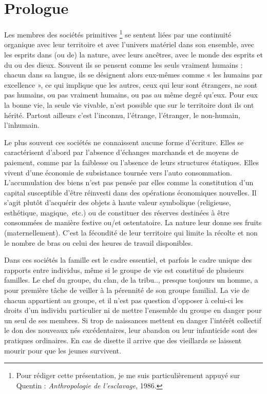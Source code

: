 

\chapter{Prologue}


Les membres des sociétés primitives%
\footnote{Pour rédiger cette présentation, je me suis particulièrement appuyé sur
Quentin  : \emph{Anthropologie de l'esclavage}, 1986.}
se sentent liées par une 
continuité organique avec leur territoire et avec l'univers matériel dans 
son ensemble, avec les esprits dans (ou de) la nature, avec leurs ancêtres, 
avec le monde des esprits et du ou des dieux. Souvent ils se pensent 
comme les seuls vraiment humains : chacun dans sa langue, ils se 
désignent alors eux-mêmes comme « les humains par excellence », ce
qui implique que les autres, ceux qui leur sont étrangers, ne sont pas humains, 
ou pas vraiment humains, ou pas au même degré qu'eux. Pour eux la 
bonne vie, la seule vie vivable, n'est possible que sur le territoire dont ils 
ont hérité. Partout ailleurs c'est l'inconnu, l'étrange, l'étranger, le
non-humain, l'inhumain.

Le plus souvent ces sociétés ne connaissent aucune forme
d'écriture. Elles se caractérisent d'abord par l'absence d'échanges marchands et 
de moyens de paiement, comme par la faiblesse ou l'absence de leurs 
structures étatiques. Elles vivent d'une économie de subsistance tournée 
vers l'auto consommation. L'accumulation des biens n'est pas pensée par 
elles comme la constitution d'un capital susceptible d'être réinvesti dans 
des opérations économiques nouvelles. Il s'agit plutôt d'acquérir des
objets à haute valeur symbolique (religieuse, esthétique, magique,~etc.) ou 
de constituer des réserves destinées à être consommées de manière
festive ou/et ostentatoire. La nature leur donne ses fruits (maternellement). 
C'est la fécondité de leur territoire qui limite la récolte et non le nombre
de bras ou celui des heures de travail disponibles.

Dans ces sociétés la famille est le cadre essentiel, et parfois le
cadre unique des rapports entre individus, même si le groupe de vie est constitué de plusieurs familles. Le chef du groupe, du clan, de la tribu.., presque toujours un 
homme, a pour première tâche de veiller à la pérennité de son groupe 
familial. La vie de chacun appartient au groupe, et il n'est pas question 
d'opposer à celui-ci les droits d'un individu particulier ni de mettre
l'ensemble du groupe en danger pour un seul de ses membres. Si trop de 
naissances mettent en danger l'intérêt collectif le don des nouveaux nés 
excédentaires, leur abandon ou leur infanticide sont des pratiques
ordinaires. En cas de disette il arrive que des vieillards se laissent mourir 
pour que les jeunes survivent.

